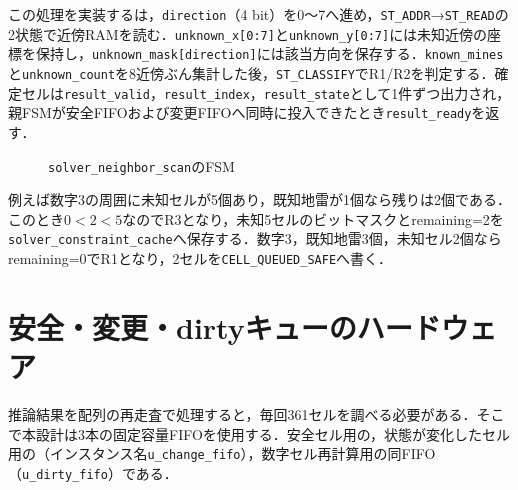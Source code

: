 この処理を実装するは，\texttt{direction}（4 bit）を0〜7へ進め，\texttt{ST\_ADDR}→\texttt{ST\_READ}の2状態で近傍RAMを読む．\texttt{unknown\_x[0:7]}と\texttt{unknown\_y[0:7]}には未知近傍の座標を保持し，\texttt{unknown\_mask[direction]}には該当方向を保存する．\texttt{known\_mines}と\texttt{unknown\_count}を8近傍ぶん集計した後，\texttt{ST\_CLASSIFY}でR1/R2を判定する．確定セルは\texttt{result\_valid}，\texttt{result\_index}，\texttt{result\_state}として1件ずつ出力され，親FSMが安全FIFOおよび変更FIFOへ同時に投入できたとき\texttt{result\_ready}を返す．

\begin{figure}[tb]
  \centering
  \caption{\texttt{solver\_neighbor\_scan}のFSM}
  \label{fig:neighbor-scan-fsm}
\end{figure}

例えば数字3の周囲に未知セルが5個あり，既知地雷が1個なら残りは2個である．このとき$0<2<5$なのでR3となり，未知5セルのビットマスクとremaining=2を\texttt{solver\_constraint\_cache}へ保存する．数字3，既知地雷3個，未知セル2個ならremaining=0でR1となり，2セルを\texttt{CELL\_QUEUED\_SAFE}へ書く．

\section{安全・変更・dirtyキューのハードウェア}
\label{sec:solver-fifos}

推論結果を配列の再走査で処理すると，毎回361セルを調べる必要がある．そこで本設計は3本の固定容量FIFOを使用する．安全セル用の，状態が変化したセル用の（インスタンス名\texttt{u\_change\_fifo}），数字セル再計算用の同FIFO（\texttt{u\_dirty\_fifo}）である．

